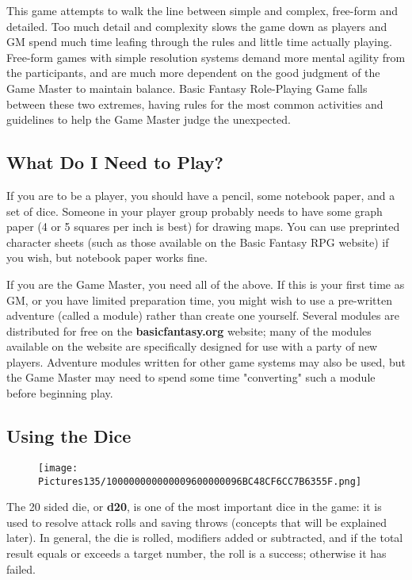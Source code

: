 \documentclass[a4paper,twoside,openany,10pt]{book}
\begin{document}
\begin{multicols}{2}
This game attempts to walk the line between simple and complex, free-form and detailed. Too much detail and complexity slows the game down as players and GM spend much time leafing through the rules and little time actually playing. Free-form games with simple resolution systems demand more mental agility from the participants, and are much more dependent on the good judgment of the Game Master to maintain balance. Basic Fantasy Role-Playing Game falls between these two extremes, having rules for the most common activities and guidelines to help the Game Master judge the unexpected.

\subsection{What Do I Need to Play?}\label{what-do-i-need-to-play}

If you are to be a player, you should have a pencil, some notebook paper, and a set of dice. Someone in your player group probably needs to have some graph paper (4 or 5 squares per inch is best) for drawing maps. You can use preprinted character sheets (such as those available on the Basic Fantasy RPG website) if you wish, but notebook paper works fine.

If you are the Game Master, you need all of the above. If this is your first time as GM, or you have limited preparation time, you might wish to use a pre-written adventure (called a module) rather than create one yourself. Several modules are distributed for free on the \textbf{basicfantasy.org} website; many of the modules available on the website are specifically designed for use with a party of new players. Adventure modules written for other game systems may also be used, but the Game Master may need to spend some time "converting" such a module before beginning play.

\bigskip

\subsection{Using the Dice}\label{using-the-dice}

\begin{wrapfigure}{r}{1.77cm}
	\texttt{[image: Pictures135/100000000000009600000096BC48CF6CC7B6355F.png]}
\end{wrapfigure}
The 20 sided die, or \textbf{d20}, is one of the most important dice in the
game: it is used to resolve attack rolls and saving throws (concepts
that will be explained later).  In general, the die is rolled, modifiers added or subtracted, and if the total result equals or exceeds a target number, the roll is a success; otherwise it has failed.


\end{multicols}
\end{document}
